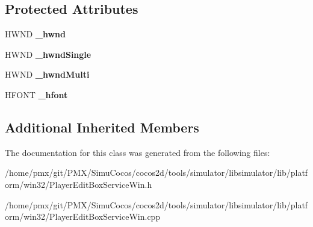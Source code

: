 \subsection*{Protected Attributes}
\begin{DoxyCompactItemize}
\item 
\mbox{\label{classPlayerEditBoxServiceWin_ae93c857f4e6309f4eef3a1f1307a9057}} 
H\+W\+ND {\bfseries \+\_\+hwnd}
\item 
\mbox{\label{classPlayerEditBoxServiceWin_a3cf5c59ee29d1d4175506da9b39fd311}} 
H\+W\+ND {\bfseries \+\_\+hwnd\+Single}
\item 
\mbox{\label{classPlayerEditBoxServiceWin_ab6cc7da20dd039ea8df11ef45ae9ea3e}} 
H\+W\+ND {\bfseries \+\_\+hwnd\+Multi}
\item 
\mbox{\label{classPlayerEditBoxServiceWin_a0ac16199c643fd4636834edff014659f}} 
H\+F\+O\+NT {\bfseries \+\_\+hfont}
\end{DoxyCompactItemize}
\subsection*{Additional Inherited Members}


The documentation for this class was generated from the following files\+:\begin{DoxyCompactItemize}
\item 
/home/pmx/git/\+P\+M\+X/\+Simu\+Cocos/cocos2d/tools/simulator/libsimulator/lib/platform/win32/Player\+Edit\+Box\+Service\+Win.\+h\item 
/home/pmx/git/\+P\+M\+X/\+Simu\+Cocos/cocos2d/tools/simulator/libsimulator/lib/platform/win32/Player\+Edit\+Box\+Service\+Win.\+cpp\end{DoxyCompactItemize}
